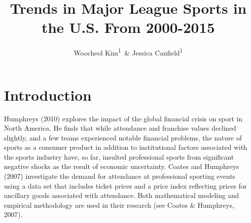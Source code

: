 \documentclass[man, fleqn, noextraspace,floatsintext]{apa6}
\title{Trends in Major League Sports in the U.S. From 2000-2015}
\author{Woocheol Kim\textsuperscript{1}~\& Jessica Canfield\textsuperscript{1}}
\date{}
\affiliation{
\vspace{0.5cm}
\textsuperscript{1} University of Oregon}
\begin{document}
\maketitle

\hypertarget{introduction}{%
\section{Introduction}\label{introduction}}

Humphreys (2010) explores the impact of the global financial crisis on sport in North America. He finds that while attendance and franchise values declined slightly, and a few teams experienced notable financial problems, the nature of sports as a consumer product in addition to institutional factors associated with the sports industry have, so far, insulted professional sports from significant negative shocks as the result of economic uncertainty. Coates and Humphreys (2007) investigate the demand for attendance at professional sporting events using a data set that includes ticket prices and a price index reflecting prices for ancillary goods associated with attendance. Both mathematical modeling and empirical methodology are used in their research (see Coates \& Humphreys, 2007).
\end{document}
